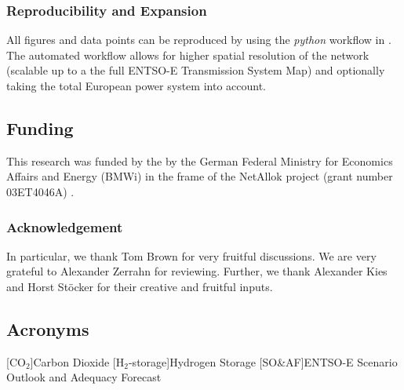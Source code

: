 \documentclass[11pt,twocolumn]{article}
\begin{document}
\subsubsection*{Reproducibility and Expansion}

All figures and data points can be reproduced by using the \textit{python} workflow in \cite{hofmann_pypsa-costallocation_2020}. The automated workflow allows for higher spatial resolution of the network (scalable up to a the full ENTSO-E Transmission System Map) and optionally taking the total European power system into account.

\subsection*{Funding}
This research was funded by the by the German Federal Ministry for Economics Affairs and Energy (BMWi) in
the frame of the NetAllok project (grant number 03ET4046A) \cite{bundesministeriumfurwirtschaftundenergieVerbundvorhabenNETALLOKMethoden}.

\subsubsection*{Acknowledgement}

In particular, we thank Tom Brown for very fruitful discussions. We are very grateful to Alexander Zerrahn for reviewing. Further, we thank Alexander Kies and Horst Stöcker for their creative and fruitful inputs.




\clearpage
\appendix
\subsection*{Acronyms}
\begin{acronym}[UMLX]
    [CO$_2$]{Carbon Dioxide}
    [H$_2$-storage]{Hydrogen Storage}
    [SO\&AF]{\acs*{ENTSO-E} Scenario Outlook and Adequacy Forecast}
\end{acronym}
\end{document}

